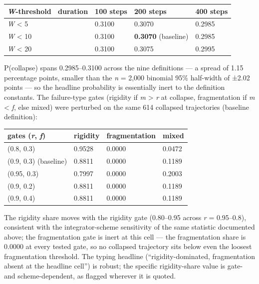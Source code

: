 \documentclass[11pt,letterpaper]{article}
\newcounter{none}
\begin{document}
{\def\LTcaptype{none} %
\begin{longtable}[]{@{}llll@{}}
\toprule\noalign{}
\emph{W}-threshold ~duration & 100 steps & 200 steps & 400 steps \\
\midrule\noalign{}
\endhead
\bottomrule\noalign{}
\endlastfoot
\emph{W} \textless{} 5 & 0.3100 & 0.3070 & 0.2985 \\
\emph{W} \textless{} 10 & 0.3100 & \textbf{0.3070} (baseline) & 0.2985 \\
\emph{W} \textless{} 20 & 0.3100 & 0.3075 & 0.2995 \\
\end{longtable}
}

P(collapse) spans 0.2985--0.3100 across the nine definitions --- a spread of 1.15 percentage points, smaller than the \emph{n} = 2,000 binomial 95\% half-width of ±2.02 points --- so the headline probability is essentially inert to the definition constants. The failure-type gates (rigidity if \textbar{}\emph{m}\textbar{} \textgreater{} \emph{r} at collapse, fragmentation if \textbar{}\emph{m}\textbar{} \textless{} \emph{f}, else mixed) were perturbed on the same 614 collapsed trajectories (baseline definition):

{\def\LTcaptype{none} %
\begin{longtable}[]{@{}llll@{}}
\toprule\noalign{}
gates (\emph{r}, \emph{f}) & rigidity & fragmentation & mixed \\
\midrule\noalign{}
\endhead
\bottomrule\noalign{}
\endlastfoot
(0.8, 0.3) & 0.9528 & 0.0000 & 0.0472 \\
(0.9, 0.3) (baseline) & 0.8811 & 0.0000 & 0.1189 \\
(0.95, 0.3) & 0.7997 & 0.0000 & 0.2003 \\
(0.9, 0.2) & 0.8811 & 0.0000 & 0.1189 \\
(0.9, 0.4) & 0.8811 & 0.0000 & 0.1189 \\
\end{longtable}
}

The rigidity share moves with the rigidity gate (0.80--0.95 across \emph{r} = 0.95--0.8), consistent with the integrator-scheme sensitivity of the same statistic documented above; the fragmentation gate is inert at this cell --- the fragmentation share is 0.0000 at every tested gate, so no collapsed trajectory sits below even the loosest fragmentation threshold. The typing headline (``rigidity-dominated, fragmentation absent at the headline cell'') is robust; the specific rigidity-share value is gate- and scheme-dependent, as flagged wherever it is quoted.
\end{document}
